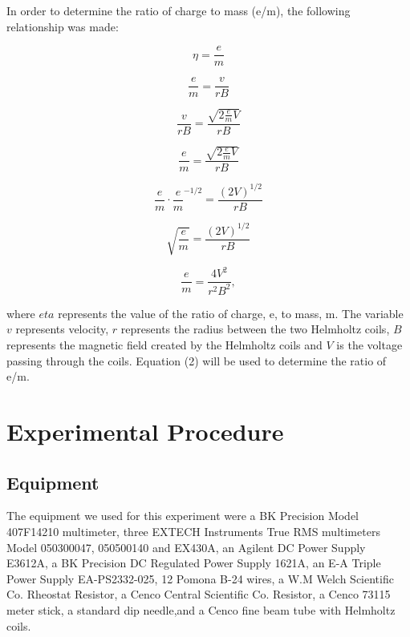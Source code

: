 \documentclass[twoside,10pt]{article}
\begin{document}
\begin{multicols}{2}
		In order to determine the ratio of charge to mass (e/m), the following relationship was made:
		
		\begin{equation*}
		 \eta = \frac{e}{m}
		\end{equation*}
	
		\begin{equation*}
		 \frac{e}{m} = \frac{v}{rB}
		\end{equation*}
		
		\begin{equation*}
		\frac{v}{rB} = \frac{ \sqrt{2 \frac{e}{m} V} }{rB}
		\end{equation*}
	
		\begin{equation*}
		 \frac{e}{m} = \frac{ \sqrt{2 \frac{e}{m} V} }{rB}
		\end{equation*}
	
		\begin{equation*}
		 \frac{e}{m} \cdot \frac{e}{m}^{-1/2} = \frac{(2V)^{1/2}}{rB} 
		\end{equation*}

		\begin{equation*}
			\sqrt{\frac{e}{m}} = \frac{(2V)^{1/2}}{rB}
		\end{equation*}

		\begin{equation}
			\frac{e}{m} = \frac{4V^2}{r^2B^2} ,
		\end{equation}

		where $eta$ represents the value of the ratio of charge, e, to mass, m. The variable $v$ represents velocity, $r$ represents the radius between the two Helmholtz coils, $B$ represents the magnetic field created by the Helmholtz coils and $V$ is the voltage passing through the coils. Equation (2) will be used to determine the ratio of e/m.
		
		
		\section{Experimental Procedure}
		
		\subsection*{Equipment}
		The equipment we used for this experiment were a BK Precision Model 407F14210 multimeter, three EXTECH Instruments True RMS multimeters Model 050300047, 050500140 and EX430A, an Agilent DC Power Supply E3612A, a BK Precision DC Regulated Power Supply 1621A, an E-A Triple Power Supply EA-PS2332-025, 12 Pomona B-24 wires, a W.M Welch Scientific Co. Rheostat Resistor, a Cenco Central Scientific Co. Resistor, a Cenco 73115 meter stick, a standard dip needle,and a Cenco fine beam tube with Helmholtz coils. 


\end{multicols}
\end{document}
